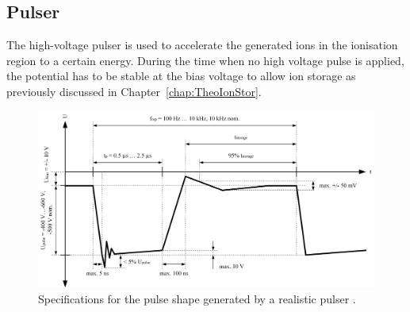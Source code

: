 	\subsection{Pulser } \label{chap:ExpPulser}%
	The high-voltage pulser is used to accelerate the generated ions in the ionisation region to a certain energy. During the time when no high voltage pulse is applied, the potential has to be stable at the bias voltage to allow ion storage as previously discussed in Chapter~\ref{chap:TheoIonStor}.\\
	\begin{figure}[H]
		\centering
		\includegraphics[width=\textwidth]{Bilder/Pulser_theretical_shape.jpg}
		\caption{Specifications for the pulse shape generated by a realistic pulser \cite{Diss_Meyer}.}
		\label{fig:PulserTheoCurve}
	\end{figure}
